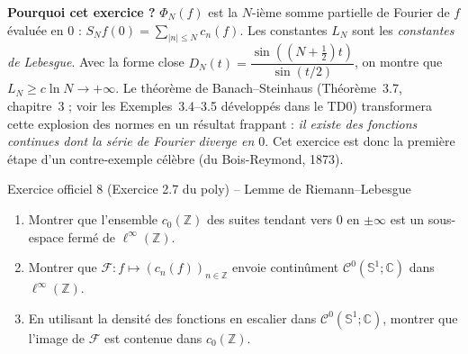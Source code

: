 \documentclass[11pt,a4paper]{article}
\newcommand{\Z}{\mathbb{Z}}
\newcommand{\C}{\mathbb{C}}
\newcommand{\Sun}{\mathbb{S}^1}
\newcommand{\Cz}{\mathcal{C}^0}
\theoremstyle{definition}
\begin{document}
\begin{commentaire}
\textbf{Pourquoi cet exercice ?} $\Phi_N(f)$ est la $N$-ième somme partielle de Fourier de $f$ évaluée en $0$ : $S_Nf(0)=\sum_{|n|\le N}c_n(f)$. Les constantes $L_N$ sont les \emph{constantes de Lebesgue}. Avec la forme close $D_N(t)=\dfrac{\sin((N+\frac12)t)}{\sin(t/2)}$, on montre que $L_N\ge c\ln N\to+\infty$. Le théorème de Banach--Steinhaus (Théorème~3.7, chapitre~3 ; voir les Exemples~3.4--3.5 développés dans le TD0) transformera cette explosion des normes en un résultat frappant : \emph{il existe des fonctions continues dont la série de Fourier diverge en $0$}. Cet exercice est donc la première étape d'un contre-exemple célèbre (du Bois-Reymond, 1873).
\end{commentaire}

\begin{exo}{Exercice officiel 8 (Exercice 2.7 du poly) -- Lemme de Riemann--Lebesgue}
\begin{enumerate}[label=(\alph*)]
  \item Montrer que l'ensemble $c_0(\Z)$ des suites tendant vers $0$ en $\pm\infty$ est un sous-espace fermé de $\ell^\infty(\Z)$.
  \item Montrer que $\mathcal F:f\mapsto(c_n(f))_{n\in\Z}$ envoie continûment $\Cz(\Sun;\C)$ dans $\ell^\infty(\Z)$.
  \item En utilisant la densité des fonctions en escalier dans $\Cz(\Sun;\C)$, montrer que l'image de $\mathcal F$ est contenue dans $c_0(\Z)$.
\end{enumerate}
\end{exo}
\end{document}
